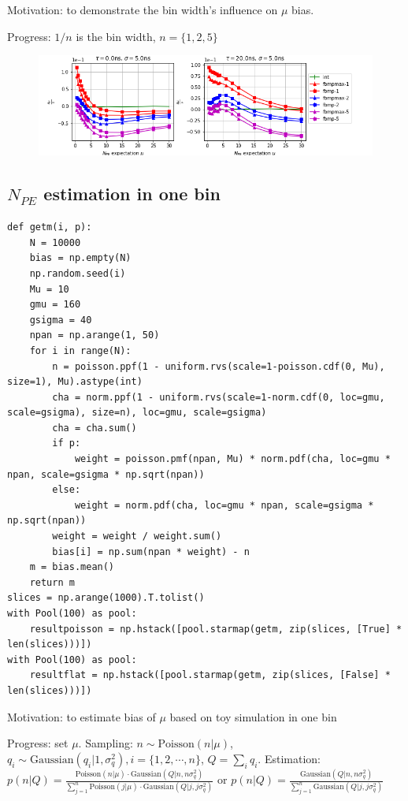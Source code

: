 \documentclass[notitlepage]{article}
\begin{document}
Motivation: to demonstrate the bin width's influence on $\mu$ bias. 

Progress: $1/n$ is the bin width, $n=\{1,2,5\}$

\begin{figure}[H]
    \includegraphics[width=\textwidth]{vs-biasmu-bin.png}
\end{figure}

\subsection{$N_{PE}$ estimation in one bin}

\begin{lstlisting}
def getm(i, p):
    N = 10000
    bias = np.empty(N)
    np.random.seed(i)
    Mu = 10
    gmu = 160
    gsigma = 40
    npan = np.arange(1, 50)
    for i in range(N):
        n = poisson.ppf(1 - uniform.rvs(scale=1-poisson.cdf(0, Mu), size=1), Mu).astype(int)
        cha = norm.ppf(1 - uniform.rvs(scale=1-norm.cdf(0, loc=gmu, scale=gsigma), size=n), loc=gmu, scale=gsigma)
        cha = cha.sum()
        if p:
            weight = poisson.pmf(npan, Mu) * norm.pdf(cha, loc=gmu * npan, scale=gsigma * np.sqrt(npan))
        else:
            weight = norm.pdf(cha, loc=gmu * npan, scale=gsigma * np.sqrt(npan))
        weight = weight / weight.sum()
        bias[i] = np.sum(npan * weight) - n
    m = bias.mean()
    return m
slices = np.arange(1000).T.tolist()
with Pool(100) as pool:
    resultpoisson = np.hstack([pool.starmap(getm, zip(slices, [True] * len(slices)))])
with Pool(100) as pool:
    resultflat = np.hstack([pool.starmap(getm, zip(slices, [False] * len(slices)))])
\end{lstlisting}

Motivation: to estimate bias of $\mu$ based on toy simulation in one bin

Progress: set $\mu$. Sampling: $n\sim\mathrm{Poisson}(n|\mu)$, $q_i\sim\mathrm{Gaussian}(q_i|1,\sigma_q^2),i=\{1,2,\cdots,n\}$, $Q=\sum_i q_i$. Estimation: $p(n|Q) = \frac{\mathrm{Poisson}(n|\mu) \cdot \mathrm{Gaussian}(Q|n,n\sigma_q^2)}{\sum_{j=1}^n \mathrm{Poisson}(j|\mu) \cdot \mathrm{Gaussian}(Q|j,j\sigma_q^2)}$ or $p(n|Q) = \frac{\mathrm{Gaussian}(Q|n,n\sigma_q^2)}{\sum_{j=1}^n \mathrm{Gaussian}(Q|j,j\sigma_q^2)}$
\end{document}
